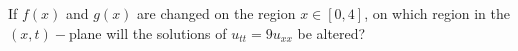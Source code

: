 \item If $f(x)$ and $g(x)$ are changed on the region $x \in [0, 4]$, on which region in the $(x, t)-$plane will the solutions of $u_{tt} = 9u_{xx}$ be altered?
